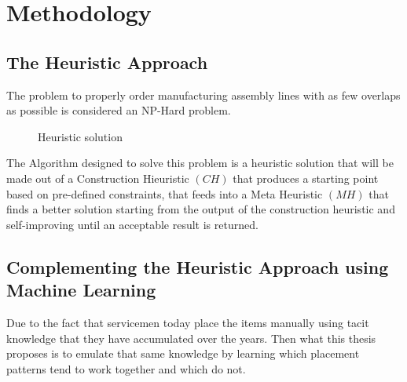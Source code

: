 \documentclass[12pt,a4paper]{report}
\begin{document}
\chapter{Methodology}
\section{The Heuristic Approach}

The problem to properly order manufacturing assembly lines with as few overlaps as possible is considered an NP-Hard problem. 

\begin{figure}[ht]
    \centering

    \caption{Heuristic solution}
    \label{fig:solution}
\end{figure}

The Algorithm designed to solve this problem is a heuristic solution that will be made out of a Construction Hieuristic $(C\!H)$ that produces a starting point based on pre-defined constraints, that feeds into a Meta Heuristic $(M\!H)$ that finds a better solution starting from the output of the construction heuristic and self-improving until an acceptable result is returned. 

\section{Complementing the Heuristic Approach using Machine Learning}
Due to the fact that servicemen today place the items manually using tacit knowledge that they have accumulated over the years. Then what this thesis proposes is to emulate that same knowledge by learning which placement patterns tend to work together and which do not.
\end{document}

